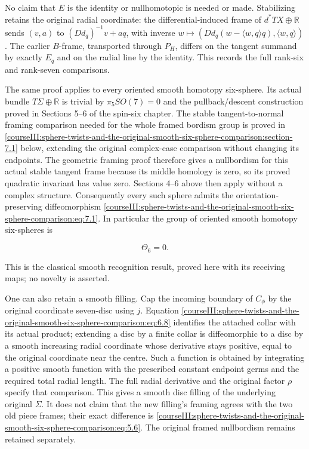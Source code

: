 No claim that \(E\) is the identity or nullhomotopic is needed or made. Stabilizing retains the original radial coordinate: the differential-induced frame of \(d^*TX\oplus\mathbb R\) sends \((v,a)\) to \((Dd_q)^{-1}v+a q\), with inverse \(w\mapsto(Dd_q(w-\langle w,q\rangle q),\langle w,q\rangle)\). The earlier \(B\)-frame, transported through \(P_H\), differs on the tangent summand by exactly \(E_q\) and on the radial line by the identity. This records the full rank-six and rank-seven comparisons.

The same proof applies to every oriented smooth homotopy six-sphere. Its actual bundle \(T\Sigma\oplus\mathbb R\) is trivial by \(\pi_5SO(7)=0\) and the pullback/descent construction proved in Sections 5--6 of the spin-six chapter. The stable tangent-to-normal framing comparison needed for the whole framed bordism group is proved in \cref{courseIII:sphere-twists-and-the-original-smooth-six-sphere-comparison:section-7.1} below, extending the original complex-case comparison without changing its endpoints. The geometric framing proof therefore gives a nullbordism for this actual stable tangent frame because its middle homology is zero, so its proved quadratic invariant has value zero. Sections 4--6 above then apply without a complex structure. Consequently every such sphere admits the orientation-preserving diffeomorphism \eqref{courseIII:sphere-twists-and-the-original-smooth-six-sphere-comparison:eq:7.1}. In particular the group of oriented smooth homotopy six-spheres is

\begin{equation}
\Theta_6=0 .
 \label{courseIII:sphere-twists-and-the-original-smooth-six-sphere-comparison:eq:7.8}
\end{equation}

This is the classical smooth recognition result, proved here with its receiving maps; no novelty is asserted.

One can also retain a smooth filling. Cap the incoming boundary of \(C_\phi\) by the original coordinate seven-disc using \(j\). Equation \eqref{courseIII:sphere-twists-and-the-original-smooth-six-sphere-comparison:eq:6.8} identifies the attached collar with its actual product; extending a disc by a finite collar is diffeomorphic to a disc by a smooth increasing radial coordinate whose derivative stays positive, equal to the original coordinate near the centre. Such a function is obtained by integrating a positive smooth function with the prescribed constant endpoint germs and the required total radial length. The full radial derivative and the original factor \(\rho\) specify that comparison. This gives a smooth disc filling of the underlying original \(\Sigma\). It does not claim that the new filling's framing agrees with the two old piece frames; their exact difference is \eqref{courseIII:sphere-twists-and-the-original-smooth-six-sphere-comparison:eq:5.6}. The original framed nullbordism remains retained separately.

